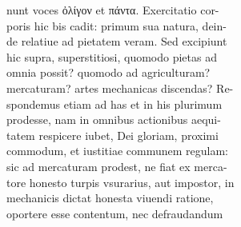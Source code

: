 \documentclass{article}
\begin{document}
\begin{pages}
                nunt voces ὀλίγον et πάντα. Exercitatio cor- \\
                poris hic bis cadit: primum sua natura, dein- \\
                de relatiue ad pietatem veram. Sed excipiunt \\
                hic supra, superstitiosi, quomodo pietas ad \\
                omnia possit? quomodo ad agriculturam? \\
                mercaturam? artes mechanicas discendas? Re- \\
                spondemus etiam ad has et in his plurimum \\
                prodesse, nam in omnibus actionibus aequi- \\
                tatem respicere iubet, Dei gloriam, proximi \\
                commodum, et iustitiae communem regulam: \\
                sic ad mercaturam prodest, ne fiat ex merca- \\
                tore honesto turpis vsurarius, aut impostor, in \\
                mechanicis dictat honesta viuendi ratione, \\
                oportere esse contentum, nec defraudandum \\
                

\end{pages}
\end{document}
